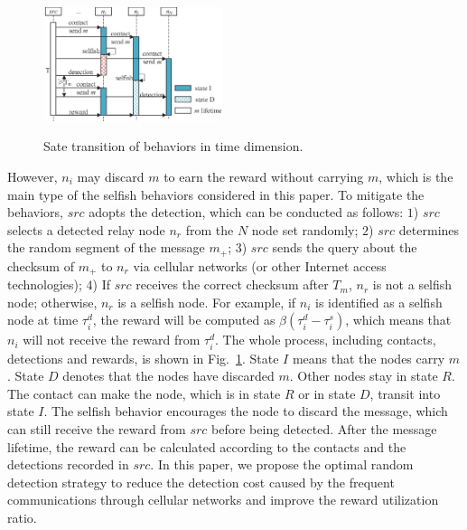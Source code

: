 \begin{figure}
  \centering
  {\includegraphics[width=0.47\textwidth]{fig/schedule.eps}}
     \caption{Sate transition of behaviors in time dimension.}
     \label{fig:schedule}
\end{figure}
However, $n_{i}$ may discard $m$
to earn the reward without carrying $m$,
which is the main type of
the selfish behaviors considered in this paper.
To mitigate the behaviors,
$src$ adopts the detection,
which can be conducted as follows:
$1$) $src$ selects a detected relay node $n_{r}$
from the $N$ node set randomly;
$2$) $src$ determines the random segment of the message $m_{+}$;
$3$) $src$ sends the query about the checksum of $m_{+}$
to $n_{r}$ via cellular networks 
(or other Internet access technologies);
$4$) If $src$ receives the correct checksum after $T_{m}$,
$n_{r}$ is not a selfish node;
otherwise, $n_{r}$ is a selfish node.
For example, if $n_{i}$ is identified
as a selfish node at time $\tau_{i}^{d}$,
the reward will be computed as $\beta(\tau_{i}^{d} - \tau_{i}^{s})$,
which means that $n_{i}$ will not receive the reward
from $\tau_{i}^{d}$.
The whole process,
including contacts, detections and rewards,
is shown in Fig.~\ref{fig:schedule}.
State $I$ means that the nodes carry $m$.
State $D$ denotes that the nodes have discarded $m$.
Other nodes stay in state $R$.
The contact can make the node,
which is in state $R$ or in state $D$,
transit into state $I$.
The selfish behavior encourages the node to discard the message,
which can still receive the reward from $src$
before being detected.
After the message lifetime,
the reward can be calculated according to
the contacts and the detections recorded in $src$.
In this paper, we propose the optimal random detection strategy
to reduce the detection cost 
caused by the frequent communications through cellular networks
and improve the reward utilization ratio.
%

